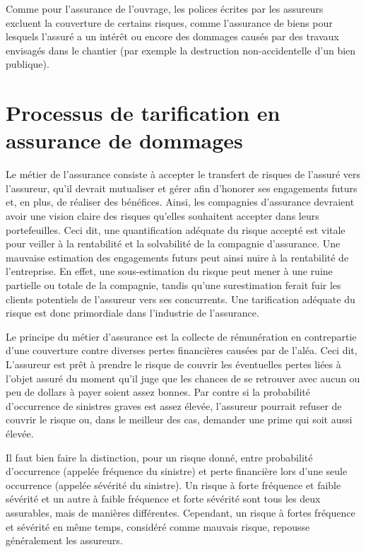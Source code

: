 \documentclass[11pt]{article}
\begin{document}
Comme pour l'assurance de l'ouvrage, les polices écrites par les assureurs excluent la couverture de certains risques, comme l'assurance de biens pour lesquels l'assuré a un intérêt ou encore des dommages causés par des travaux envisagés dans le chantier (par exemple la destruction non-accidentelle d'un bien publique).


\section{Processus de tarification en assurance de dommages}

Le métier de l'assurance consiste à accepter le transfert de risques de l'assuré vers l'assureur, qu'il devrait mutualiser et gérer afin d'honorer ses engagements futurs et, en plus, de réaliser des bénéfices. Ainsi, les compagnies d'assurance devraient avoir une vision claire des risques qu'elles souhaitent accepter dans leurs portefeuilles. Ceci dit, une quantification adéquate du risque accepté est vitale pour veiller à la rentabilité et la solvabilité de la compagnie d'assurance. Une mauvaise estimation des engagements futurs peut ainsi nuire à la rentabilité de l'entreprise. En effet, une sous-estimation du risque peut mener à une ruine partielle ou totale de la compagnie, tandis qu'une surestimation ferait fuir les clients potentiels de l'assureur vers ses concurrents. Une tarification adéquate du risque est donc primordiale dans l'industrie de l'assurance. 

Le principe du métier d'assurance est la collecte de rémunération en contrepartie d'une couverture contre diverses pertes financières causées par de l'aléa. Ceci dit, L'assureur est prêt à prendre le risque de couvrir les éventuelles pertes liées à l'objet assuré du moment qu'il juge que les chances de se retrouver avec aucun ou peu de dollars à payer soient assez bonnes. Par contre si la probabilité d'occurrence de sinistres graves est assez élevée, l'assureur pourrait refuser de couvrir le risque ou, dans le meilleur des cas, demander une prime qui soit aussi élevée. 

Il faut bien faire la distinction, pour un risque donné, entre probabilité d'occurrence (appelée fréquence du sinistre) et  perte financière lors d'une seule occurrence (appelée sévérité du sinistre). Un risque à forte fréquence et faible sévérité et un autre à faible fréquence et forte sévérité sont tous les deux assurables, mais de manières différentes. Cependant, un risque à fortes fréquence et sévérité en même temps, considéré comme mauvais risque, repousse généralement les assureurs.
\end{document}
